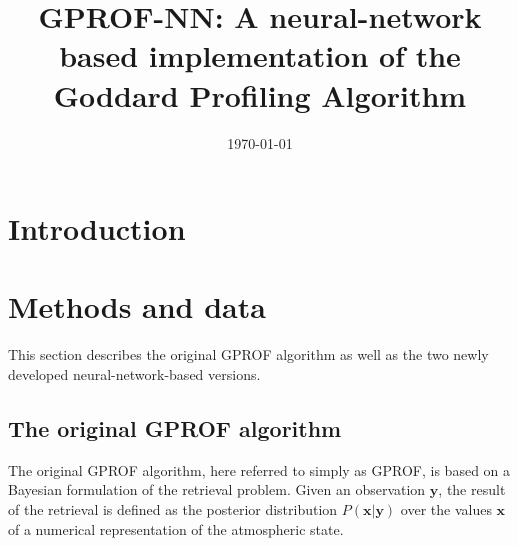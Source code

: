 \documentclass[a4paper,11pt,bibtotoc]{scrartcl}
\begin{document}
\title{GPROF-NN: A neural-network based implementation of the Goddard Profiling Algorithm}
\date{\today}

\maketitle


\section{Introduction}
\section{Methods and data}

This section describes the original GPROF algorithm as well as the two newly
developed neural-network-based versions.

\subsection{The original GPROF algorithm}

The original GPROF algorithm, here referred to simply as GPROF, is based on a
Bayesian formulation of the retrieval problem. Given an observation
$\mathbf{y}$, the result of the retrieval is defined as the posterior
distribution $P(\mathbf{x} | \mathbf{y})$ over the values $\mathbf{x}$ of a
numerical representation of the atmospheric state.
\end{document}
